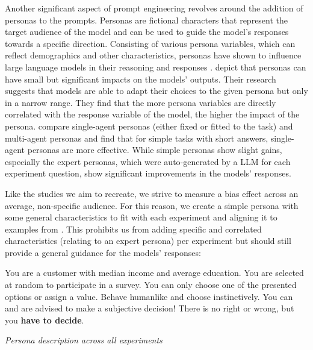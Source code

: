 \par Another significant aspect of prompt engineering revolves around the addition of personas to the prompts. Personas are fictional characters that represent the target audience of the model and can be used to guide the model's responses towards a specific direction. Consisting of various persona variables, which can reflect demographics and other characteristics, personas have shown to influence large language models in their reasoning and responses \parencite{chen2023unleashing,hu2024quantifying,olea2024evaluating}. \textcite{hu2024quantifying} depict that personas can have small but significant impacts on the models' outputs. Their research suggests that models are able to adapt their choices to the given persona but only in a narrow range. They find that the more persona variables are directly correlated with the response variable of the model, the higher the impact of the persona. \textcite{olea2024evaluating} compare single-agent personas (either fixed or fitted to the task) and multi-agent personas and find that for simple tasks with short answers, single-agent personas are more effective. While simple personas show slight gains, especially the expert personas, which were auto-generated by a LLM for each experiment question, show significant improvements in the models' responses.

Like the studies we aim to recreate, we strive to measure a bias effect across an average, non-specific audience. For this reason, we create a simple persona with some general characteristics to fit with each experiment and aligning it to examples from \textcite{brand2023using}. This prohibits us from adding specific and correlated characteristics (relating to an expert persona) per experiment but should still provide a general guidance for the models' responses:
\begin{table}[ht]
    \begin{tcolorbox}[
        colframe=gray!90,    %
        colback=white,     %
        boxrule=0.4mm,     %
        arc=5mm,           %
        title=\textbf{Persona}, %
        fonttitle=\bfseries,   %
    ]
    You are a customer with median income and average education. You are selected at random to participate in a survey. You can only choose one of the presented options or assign a value. Behave humanlike and choose instinctively. You can and are advised to make a subjective decision! There is no right or wrong, but you \textbf{have to decide}.
    \end{tcolorbox}

    \caption[Persona description]{\textit{Persona description across all experiments}}
    \label{tab:persona-description}
    \centering
\end{table}

